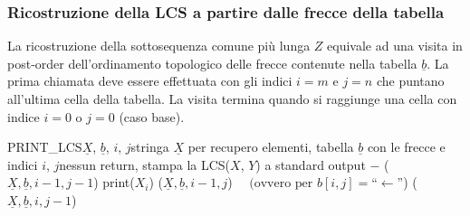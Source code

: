 \subsubsection*{Ricostruzione della LCS a partire dalle frecce della tabella}
La ricostruzione della sottosequenza comune più lunga \(Z\) equivale ad una visita in post-order dell'ordinamento topologico
delle frecce contenute nella tabella \(\underline{b}\). La prima chiamata deve essere effettuata con gli indici \(i = m\)
e \(j = n\) che puntano all'ultima cella della tabella. La visita termina quando si raggiunge una cella con indice \(i = 0\)
o \(j = 0\) (caso base).

\begin{algo}{PRINT\_LCS}{$\underline{X}$, $\underline{b}$, $i$, $j$}{stringa $\underline{X}$ per recupero elementi, tabella $\underline{b}$ con le frecce e indici $i$, $j$}{nessun return, stampa la LCS($X$, $Y$) a standard output}
	 
		\State \Return \(-\)
	\EndIf
	 
		\State {}(\(\underline{X}, \underline{b}, i-1, j-1\))
		\State print(\(X_i\))
	 
		\State {}(\(\underline{X}, \underline{b}, i-1, j\))
	\Else \(\quad (\text{ovvero per }b[i, j] = \text{``}\leftarrow\text{''}\)) 
		\State {}(\(\underline{X}, \underline{b}, i, j-1\))
	\EndIf
\end{algo}

\newpage

